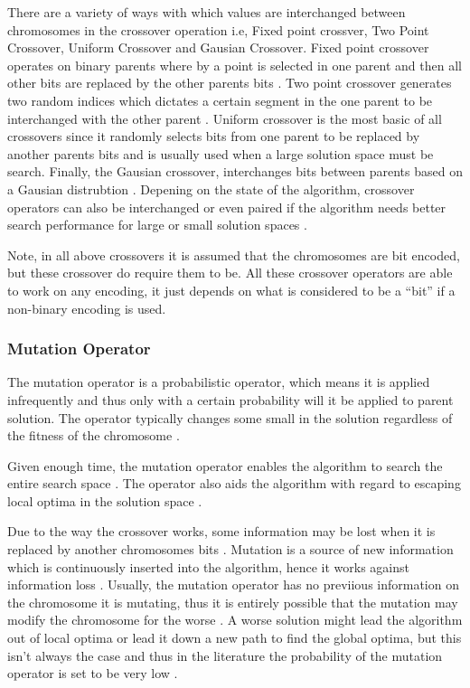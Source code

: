 There are a variety of ways with which values are interchanged between chromosomes in the crossover operation i.e, Fixed point crossver, Two Point Crossover, Uniform Crossover and Gausian Crossover. Fixed point crossover operates on binary parents where by a point is selected in one parent and then all other bits are replaced by the other parents bits \cite{HumanPassiveGA}. Two point crossover generates two random indices which dictates a certain segment in the one parent to be interchanged with the other parent \cite{ConstrainedGA}. Uniform crossover is the most basic of all crossovers since it randomly selects bits from one parent to be replaced by another parents bits and is usually used when a large solution space must be search\cite{ParallelGASA,GeostatisticalGA}. Finally, the Gausian crossover, interchanges bits between parents based on a Gausian distrubtion \cite{ParallelGASA,GeostatisticalGA}. Depening on the state of the algorithm, crossover operators can also be interchanged or even paired if the algorithm needs better search performance for large or small solution spaces \cite{HetergeneousGA,ParallelGASA}.

Note, in all above crossovers it is assumed that the chromosomes are bit encoded, but these crossover do require them to be. All these crossover operators are able to work on any encoding, it just depends on what is considered to be a ``bit'' if a non-binary encoding is used. 
\subsubsection{Mutation Operator}
The mutation operator is a probabilistic operator, which means it is applied infrequently and thus only with a certain probability will it be applied to parent solution. The operator typically changes some small in the solution regardless of the fitness of the chromosome \cite{HybridBaldwinGA,HumanPassiveGA}.

Given enough time, the mutation operator enables the algorithm to search the entire search space \cite{FamilyGA}. The operator also aids the algorithm with regard to escaping local optima in the solution space \cite{FamilyGA}.

Due to the way the crossover works, some information may be lost when it is replaced by another chromosomes bits \cite{AcceleratingGA,ConstrainedGA}. Mutation is a source of new information which is continuously inserted into the algorithm, hence it works against information loss \cite{CoactiveFuzzyGA,AcceleratingGA,ConstrainedGA}. Usually, the mutation operator has no previious information on the chromosome it is mutating, thus it is entirely possible that the mutation may modify the chromosome for the worse \cite{AcceleratingGA}. A worse solution might lead the algorithm out of local optima or lead it down a new path to find the global optima, but this isn't always the case and thus in the literature the probability of the mutation operator is set to be very low \cite{AdaptiveSAGA,FamilyGA,ConstrainedGA}.

